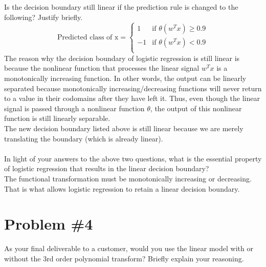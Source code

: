\documentclass[12pt]{article}
\begin{document}
	Is the decision boundary still linear if the prediction rule is changed to the following? Justify briefly.
	\begin{equation*}
	\text{Predicted class of x} = 
	\begin{cases}
	1 & \text{if } \theta(w^Tx) \ge 0.9 \\
	-1 & \text{if } \theta(w^Tx) < 0.9 \\
	\end{cases}
	\end{equation*}
	The reason why the decision boundary of logistic regression is still linear is because the nonlinear function that processes the linear signal $w^T x$ is a monotonically increasing function. In other words, the output can be linearly separated because monotonically increasing/decreasing functions will never return to a value in their codomains after they have left it. Thus, even though the linear signal is passed through a nonlinear function $\theta$, the output of this nonlinear function is still linearly separable. \\
	The new decision boundary listed above is still linear because we are merely translating the boundary (which is already linear).
	\\ \\
	In light of your answers to the above two questions, what is the essential property of logistic regression that results in the linear decision boundary? \\
	The functional transformation must be monotonically increasing or decreasing. That is what allows logistic regression to retain a linear decision boundary.
	
	
	
	
	\section*{Problem \#4}
	As your final deliverable to a customer, would you use the linear model with or without the 3rd order polynomial transform? Briefly explain your reasoning.
	
\end{document}
